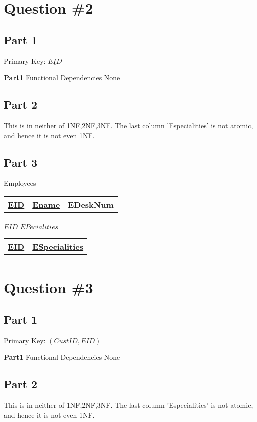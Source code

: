 \documentclass[a4paper,11pt,x11names]{article}
\begin{document}
		
\section{{Question \#2}}
\subsection{Part 1}
    Primary Key: $\underline{EID}$ 
    
    \textbf{Part1} Functional Dependencies
	None
	
\subsection{Part 2}
This is in neither of 1NF,2NF,3NF. The last column 'Especialities' is not atomic, and hence it is not even 1NF.
\subsection{Part 3}
    Employees
	\begin{tabular}{|c|c|c|}
	\hline \underline{EID} & \underline{Ename}  & EDeskNum  \\ 
	\hline  &  &    \\ 
	\hline 
	\end{tabular} 
	\newline
	$EID\_EPecialities$
	\begin{tabular}{|c|c|}
		\hline \underline{EID}  & \underline{ESpecialities}   \\ 
		\hline  &    \\ 
		\hline 
	\end{tabular} 
	\newline	



\section{{Question \#3}}
\subsection{Part 1}
    Primary Key: $(\underline{CustID},\underline{EID})$ 
    
    \textbf{Part1} Functional Dependencies
	None
	
\subsection{Part 2}
This is in neither of 1NF,2NF,3NF. The last column 'Especialities' is not atomic, and hence it is not even 1NF.
\end{document}
